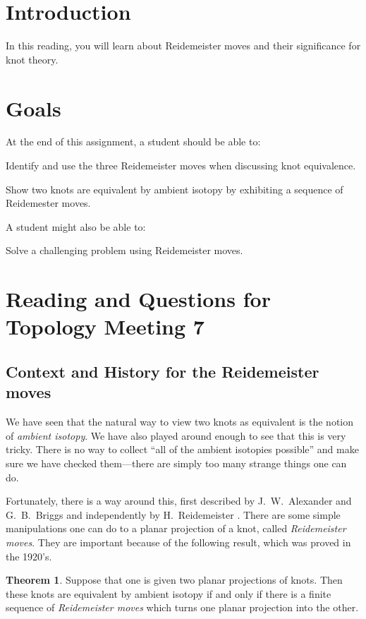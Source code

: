 \documentclass[12pt,letterpaper]{article}
\theoremstyle{definition}
\newtheorem*{theorem}{Theorem}
\begin{document}
\setlength{\parskip}{1ex plus 0.5ex minus 0.2ex}
\setlength{\parindent}{0pt}

\pagestyle{fancy}
\cfoot{}

\section*{Introduction}
In this reading, you will learn about Reidemeister moves and their significance for knot theory.

\section*{Goals}
At the end of this assignment, a student should be able to:
\begin{compactitem}
\item Identify and use the three Reidemeister moves when discussing knot equivalence.
\item Show two knots are equivalent by ambient isotopy by exhibiting a sequence of Reidemester moves.
\end{compactitem}
A student might also be able to:
\begin{compactitem}
\item Solve a challenging problem using Reidemeister moves.
\end{compactitem}

\section*{Reading and Questions for Topology Meeting 7}

\subsection*{Context and History for the Reidemeister moves}
We have seen that the natural way to view two knots as equivalent is the notion of \emph{ambient isotopy}.
We have also played around enough to see that this is very tricky.
There is no way to collect ``all of the ambient isotopies possible'' and make sure we have checked them---there are simply too many strange things one can do.

Fortunately, there is a way around this, first described by J.~W.~Alexander and G.~B.~Briggs \cite{AB} and independently by H.~Reidemeister \cite{R}.
There are some simple manipulations one can do to a planar projection of a knot, called \emph{Reidemeister moves}.
They are important because of the following result, which was proved in the 1920's.
\begin{theorem}
Suppose that one is given two planar projections of knots.
Then these knots are equivalent by ambient isotopy if and only if there is a finite sequence of \emph{Reidemeister moves} which turns one planar projection into the other.
\end{theorem}
\end{document}

